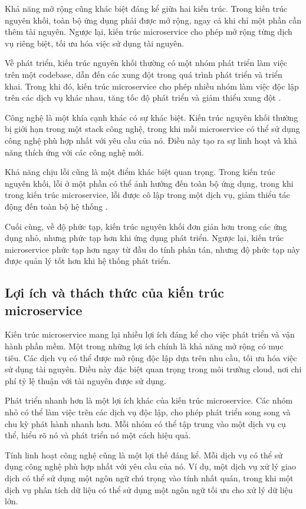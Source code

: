 Khả năng mở rộng cũng khác biệt đáng kể giữa hai kiến trúc. Trong kiến trúc
nguyên khối, toàn bộ ứng dụng phải được mở rộng, ngay cả khi chỉ một phần cần
thêm tài nguyên. Ngược lại, kiến trúc microservice cho phép mở rộng từng dịch
vụ riêng biệt, tối ưu hóa việc sử dụng tài nguyên.

Về phát triển, kiến trúc nguyên khối thường có một nhóm phát triển làm việc
trên một codebase, dẫn đến các xung đột trong quá trình phát triển và triển
khai. Trong khi đó, kiến trúc microservice cho phép nhiều nhóm làm việc độc lập
trên các dịch vụ khác nhau, tăng tốc độ phát triển và giảm thiểu xung đột \cite{richardson2019}.

Công nghệ là một khía cạnh khác có sự khác biệt. Kiến trúc nguyên khối thường
bị giới hạn trong một stack công nghệ, trong khi mỗi microservice có thể sử
dụng công nghệ phù hợp nhất với yêu cầu của nó. Điều này tạo ra sự linh hoạt và
khả năng thích ứng với các công nghệ mới.

Khả năng chịu lỗi cũng là một điểm khác biệt quan trọng. Trong kiến trúc nguyên
khối, lỗi ở một phần có thể ảnh hưởng đến toàn bộ ứng dụng, trong khi trong
kiến trúc microservice, lỗi được cô lập trong một dịch vụ, giảm thiểu tác động
đến toàn bộ hệ thống \cite{fowler2014}.

Cuối cùng, về độ phức tạp, kiến trúc nguyên khối đơn giản hơn trong các ứng
dụng nhỏ, nhưng phức tạp hơn khi ứng dụng phát triển. Ngược lại, kiến trúc
microservice phức tạp hơn ngay từ đầu do tính phân tán, nhưng độ phức tạp này
được quản lý tốt hơn khi hệ thống phát triển.

\subsection{Lợi ích và thách thức của kiến trúc microservice}
Kiến trúc microservice mang lại nhiều lợi ích đáng kể cho việc phát triển và
vận hành phần mềm. Một trong những lợi ích chính là khả năng mở rộng có mục
tiêu. Các dịch vụ có thể được mở rộng độc lập dựa trên nhu cầu, tối ưu hóa việc
sử dụng tài nguyên. Điều này đặc biệt quan trọng trong môi trường cloud, nơi
chi phí tỷ lệ thuận với tài nguyên được sử dụng.

Phát triển nhanh hơn là một lợi ích khác của kiến trúc microservice. Các nhóm
nhỏ có thể làm việc trên các dịch vụ độc lập, cho phép phát triển song song và
chu kỳ phát hành nhanh hơn. Mỗi nhóm có thể tập trung vào một dịch vụ cụ thể,
hiểu rõ nó và phát triển nó một cách hiệu quả.

Tính linh hoạt công nghệ cũng là một lợi thế đáng kể. Mỗi dịch vụ có thể sử
dụng công nghệ phù hợp nhất với yêu cầu của nó. Ví dụ, một dịch vụ xử lý giao
dịch có thể sử dụng một ngôn ngữ chú trọng vào tính nhất quán, trong khi một
dịch vụ phân tích dữ liệu có thể sử dụng một ngôn ngữ tối ưu cho xử lý dữ liệu
lớn.

